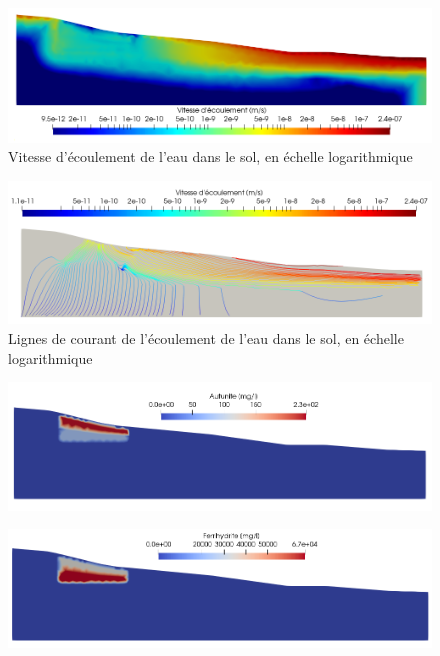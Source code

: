 \documentclass{article}
\begin{document}
\begin{figure}[H]
    \centering
    \includegraphics[width=\linewidth]{LJ-vitesse-ecoulement.PNG}
    \caption{Vitesse d'écoulement de l'eau dans le sol, en échelle logarithmique}
    \label{fig:vitesse_ecoulement}
\end{figure}
\begin{figure}[H]
    \centering
    \includegraphics[width=\linewidth]{LJ-flowrate-lines.PNG}
    \caption{Lignes de courant de l'écoulement de l'eau dans le sol, en échelle logarithmique}
    \label{fig:vitesse_ecoulement_lines}
\end{figure}
\newpage
\begin{figure}[H]
    \centering
    \includegraphics[width=\linewidth]{LJ-Autunite-concentration.PNG}
    \caption{}
    \label{fig:concentration_autunite}
\end{figure}

\begin{figure}[H]
    \centering
    \includegraphics[width=\linewidth]{LJ-Ferrihydrite-concentration.PNG}
    \caption{}
    \label{fig:concentration_ferrihydrite}
\end{figure}
\end{document}
